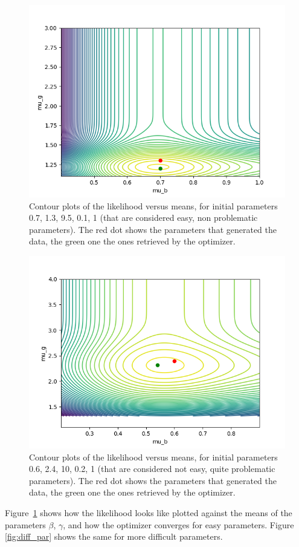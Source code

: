 \documentclass{article}
\begin{document}
\begin{figure}
  \centering
  \includegraphics[width=.8\textwidth]{img/contour_mus.png}
  \caption{Contour plots of the likelihood versus means, for initial parameters 0.7, 1.3, 9.5, 0.1, 1 (that are considered easy, non problematic parameters). The red dot shows the parameters that generated the data, the green one the ones retrieved by the optimizer.}
  \label{fig:easy_par}
\end{figure}


\begin{figure}
  \centering
  \includegraphics[width=.8\textwidth]{img/contour_mus_not_converging.png}
  \caption{Contour plots of the likelihood versus means, for initial parameters 0.6, 2.4, 10, 0.2, 1 (that are considered not easy, quite problematic parameters). The red dot shows the parameters that generated the data, the green one the ones retrieved by the optimizer.}
  \label{fig:diff_par}
\end{figure}


Figure~\ref{fig:easy_par} shows how the likelihood looks like plotted against the means of the parameters \(\beta\), \(\gamma\), and how the optimizer converges for easy parameters.
Figure \autoref{fig:diff_par} shows the same for more difficult parameters.
\end{document}
